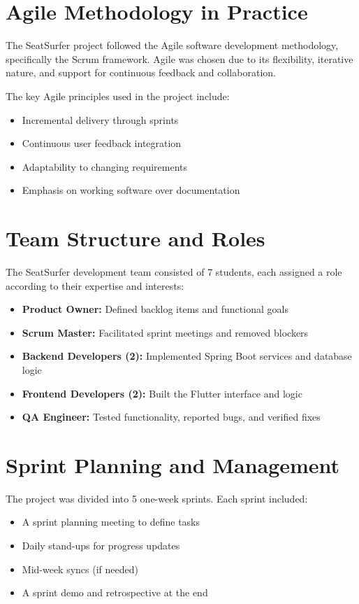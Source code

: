 \documentclass[12pt,a4paper]{report}
\begin{document}
\section{Agile Methodology in Practice}

The SeatSurfer project followed the Agile software development methodology, specifically the Scrum framework. Agile was chosen due to its flexibility, iterative nature, and support for continuous feedback and collaboration.

The key Agile principles used in the project include:
\begin{itemize}
    \item Incremental delivery through sprints
    \item Continuous user feedback integration
    \item Adaptability to changing requirements
    \item Emphasis on working software over documentation
\end{itemize}

\section{Team Structure and Roles}

The SeatSurfer development team consisted of 7 students, each assigned a role according to their expertise and interests:

\begin{itemize}
    \item \textbf{Product Owner:} Defined backlog items and functional goals
    \item \textbf{Scrum Master:} Facilitated sprint meetings and removed blockers
    \item \textbf{Backend Developers (2):} Implemented Spring Boot services and database logic
    \item \textbf{Frontend Developers (2):} Built the Flutter interface and logic
    \item \textbf{QA Engineer:} Tested functionality, reported bugs, and verified fixes
\end{itemize}

\section{Sprint Planning and Management}

The project was divided into 5 one-week sprints. Each sprint included:

\begin{itemize}
    \item A sprint planning meeting to define tasks
    \item Daily stand-ups for progress updates
    \item Mid-week syncs (if needed)
    \item A sprint demo and retrospective at the end
\end{itemize}
\end{document}
